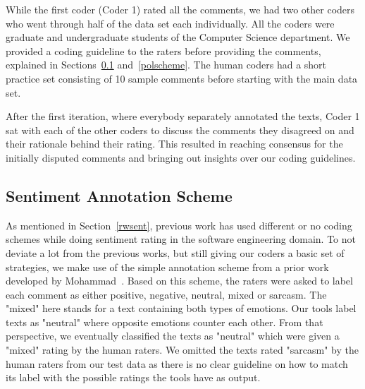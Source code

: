 While the first coder (Coder 1) rated all the comments, 
we had two other coders 
who went through half of the data set each individually. 
All the coders were graduate and undergraduate students 
of the Computer Science department. 
We provided a coding guideline 
to the raters before providing the comments, 
explained in Sections~\ref{sentscheme} and~\ref{polscheme}. 
The human coders had a short practice set 
consisting of 10 sample comments 
before starting with the main data set.

After the first iteration, 
where everybody separately annotated the texts, 
Coder 1 sat with each of the other coders 
to discuss the comments they disagreed on 
and their rationale behind their rating. 
This resulted in reaching consensus 
for the initially disputed comments 
and bringing out insights over our coding guidelines.

\subsection{Sentiment Annotation Scheme}\label{sentscheme}


As mentioned in Section~\ref{rwsent}, 
previous work has used different or no coding schemes 
while doing sentiment rating in the software engineering domain. 
To not deviate a lot from the previous works, 
but still giving our coders a basic set of strategies, 
we make use of the simple annotation scheme 
from a prior work developed by Mohammad~\cite{mohammad2016practical}. 
Based on this scheme, 
the raters were asked to label each comment as 
either positive, negative, neutral, mixed or sarcasm. 
The "mixed" here stands for a text containing both types of emotions. Our tools label texts as "neutral" 
where opposite emotions counter each other. 
From that perspective, 
we eventually classified the texts as "neutral" 
which were given a "mixed" rating by the human raters. 
We omitted the texts rated "sarcasm" by the human raters 
from our test data as there is no clear guideline 
on how to match its label with the 
possible ratings the tools have as output. 

